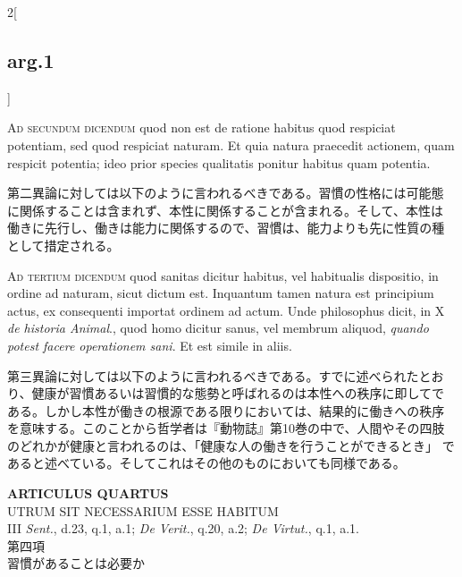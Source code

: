 \documentclass[paper=a4paper,fontsize=10pt,jafontsize=9pt,titlepage]{jlreq}
\begin{document}
\begin{paracol}{2}[\subsection{arg.1}]
\switchcolumn*[\subsection{ad.2}]

{\scshape Ad secundum dicendum} quod non est de ratione habitus quod respiciat
potentiam, sed quod respiciat naturam. Et quia natura praecedit
actionem, quam respicit potentia; ideo prior species qualitatis
ponitur habitus quam potentia.

\switchcolumn

第二異論に対しては以下のように言われるべきである。習慣の性格には可能態
に関係することは含まれず、本性に関係することが含まれる。そして、本性は
働きに先行し、働きは能力に関係するので、習慣は、能力よりも先に性質の種
として措定される。

\switchcolumn*[\subsection{ad.3}]

{\scshape Ad tertium dicendum} quod sanitas dicitur habitus, vel habitualis
dispositio, in ordine ad naturam, sicut dictum est. Inquantum tamen
natura est principium actus, ex consequenti importat ordinem ad
actum. Unde philosophus dicit, in X {\itshape de historia Animal}., quod homo
dicitur sanus, vel membrum aliquod, {\itshape quando potest facere operationem
sani}. Et est simile in aliis.

\switchcolumn

第三異論に対しては以下のように言われるべきである。すでに述べられたとお
り、健康が習慣あるいは習慣的な態勢と呼ばれるのは本性への秩序に即してで
ある。しかし本性が働きの根源である限りにおいては、結果的に働きへの秩序
を意味する。このことから哲学者は『動物誌』第10巻の中で、人間やその四肢
のどれかが健康と言われるのは、「健康な人の働きを行うことができるとき」
であると述べている。そしてこれはその他のものにおいても同様である。

\end{paracol}
\newpage


{}
\setcounter{section}{4}
\setcounter{subsection}{0}
\begin{center}
{\Large {\bfseries ARTICULUS QUARTUS}}\\
{\large UTRUM SIT NECESSARIUM ESSE HABITUM}\\
{\footnotesize III {\itshape Sent.}, d.23, q.1, a.1; {\itshape De
 Verit.}, q.20, a.2; {\itshape De Virtut.}, q.1, a.1.}\\
{\Large 第四項\\習慣があることは必要か}
\end{center}
\end{document}
